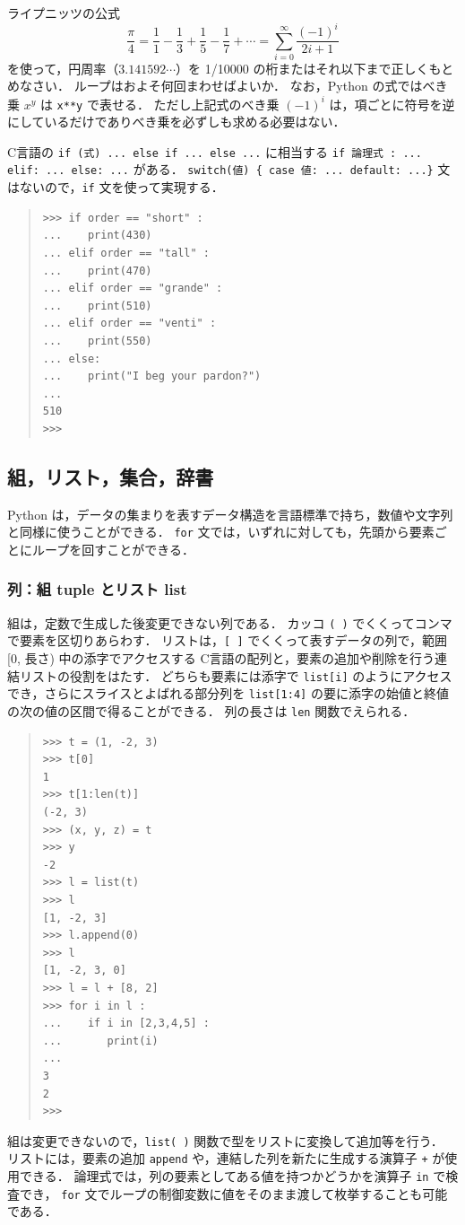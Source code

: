 \documentclass[11pt,a4,epsf]{report}
\begin{document}
\begin{excercise}
ライプニッツの公式
\[
\frac{\pi}{4} = \frac{1}{1} - \frac{1}{3} + \frac{1}{5} - \frac{1}{7} + \cdots = \sum_{i=0}^{\infty}\frac{(-1)^i}{2i+1}
\]
を使って，円周率（$3.141592\cdots$）を 1/10000 の桁またはそれ以下まで正しくもとめなさい．
ループはおよそ何回まわせばよいか．
なお，Python の式ではべき乗 $x^y$ は \verb+x**y+ で表せる．
ただし上記式のべき乗 $(-1)^i$ は，項ごとに符号を逆にしているだけでありべき乗を必ずしも求める必要はない．
\end{excercise}


C言語の \verb+if (式) ... else if ... else ...+ に相当する \verb+if 論理式 : ... elif: ... else: ...+ がある．
\verb+switch(値) { case 値: ... default: ...}+ 文はないので，\verb+if+ 文を使って実現する．
\begin{quote}
\small
\begin{verbatim}
>>> if order == "short" :
...    print(430)
... elif order == "tall" :
...    print(470)
... elif order == "grande" :
...    print(510)
... elif order == "venti" :
...    print(550)
... else:
...    print("I beg your pardon?")
...
510
>>>
\end{verbatim}
\end{quote}

\subsection{組，リスト，集合，辞書}

Python は，データの集まりを表すデータ構造を言語標準で持ち，数値や文字列と同様に使うことができる．
\verb+for+ 文では，いずれに対しても，先頭から要素ごとにループを回すことができる．

\subsubsection{列：組 tuple とリスト list}
組は，定数で生成した後変更できない列である．
カッコ \verb+( )+ でくくってコンマで要素を区切りあらわす．
リストは，\verb+[ ]+ でくくって表すデータの列で，範囲 [0, 長さ) 中の添字でアクセスする C言語の配列と，要素の追加や削除を行う連結リストの役割をはたす．
どちらも要素には添字で \verb+list[i]+ のようにアクセスでき，さらにスライスとよばれる部分列を \verb+list[1:4]+ の要に添字の始値と終値の次の値の区間で得ることができる．
列の長さは \verb+len+ 関数でえられる．
\begin{quote}
\small
\begin{verbatim}
>>> t = (1, -2, 3)
>>> t[0]
1
>>> t[1:len(t)]
(-2, 3)
>>> (x, y, z) = t
>>> y
-2
>>> l = list(t)
>>> l
[1, -2, 3]
>>> l.append(0)
>>> l
[1, -2, 3, 0]
>>> l = l + [8, 2]
>>> for i in l :
...    if i in [2,3,4,5] :
...       print(i)
...
3
2
>>>
\end{verbatim}
\end{quote}
組は変更できないので，\verb+list( )+ 関数で型をリストに変換して追加等を行う．
リストには，要素の追加 \verb+append+ や，連結した列を新たに生成する演算子 \verb$+$ が使用できる．
論理式では，列の要素としてある値を持つかどうかを演算子 \verb+in+ で検査でき，
\verb+for+ 文でループの制御変数に値をそのまま渡して枚挙することも可能である．
\end{document}
